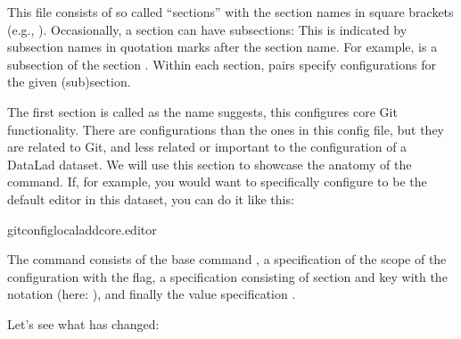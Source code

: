 \sphinxAtStartPar
This file consists of so called “sections” with the section names
in square brackets (e.g., ). Occasionally, a section can have
subsections: This is indicated by subsection names in
quotation marks after the section name. For example,  is a subsection
of the section .
Within each section,  pairs specify configurations
for the given (sub)section.

\ignorespaces 
\sphinxAtStartPar
The first section is called  \textendash{} as the name suggests,
this configures core Git functionality. There are
configurations than the ones in this config file, but
they are related to Git, and less related or important to the configuration of
a DataLad dataset. We will use this section to showcase the anatomy of the
 command. If, for example, you would want to specifically
configure {\hyperref[\detokenize{glossary:term-nano}]{}} to be the default editor in this dataset, you
can do it like this:

\begin{sphinxVerbatim}[commandchars=\\\{\}]
gitconfig\PYGZhy{}\PYGZhy{}local\PYGZhy{}\PYGZhy{}addcore.editor
\end{sphinxVerbatim}

\sphinxAtStartPar
The command consists of the base command ,
a specification of the scope of the configuration with the 
flag, a  specification consisting of section and key with the
notation  (here: ), and finally the value
specification .

\sphinxAtStartPar
Let’s see what has changed:

